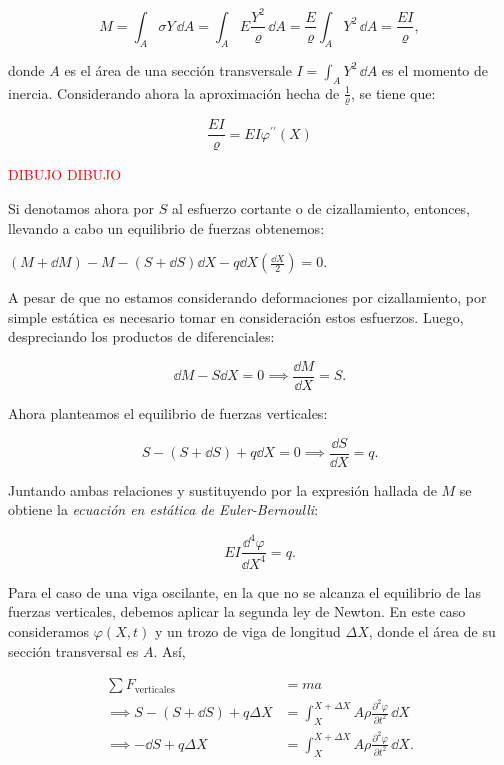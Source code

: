 \[M = \int_A \sigma Y \, \dd A = \int_A E \frac{Y^2}{\varrho} \, \dd A = \frac{E}{\varrho} \int_A Y^2 \, \dd A = \frac{E I}{\varrho},\]

donde $A$ es el área de una sección transversal\footnotemark e $I = \int_A Y^2 \, \dd A$ es el momento de inercia. Considerando ahora la aproximación hecha de $\frac{1}{\varrho}$, se tiene que:

\[\frac{E I}{\varrho} = EI \varphi^{\prime \prime}(X)\]

\textcolor{red}{DIBUJO}
\textcolor{red}{DIBUJO}

Si denotamos ahora por $S$ al esfuerzo cortante o de cizallamiento, entonces, llevando a cabo un equilibrio de fuerzas obtenemos:

$(M + \dd M) - M - (S + \dd S)\dd X - q \dd X \left(\frac{\dd X}{2}\right) = 0.$

A pesar de que no estamos considerando deformaciones por cizallamiento, por simple estática es necesario tomar en consideración estos esfuerzos. Luego, despreciando los productos de diferenciales:

\[\dd M - S\dd X = 0 \implies \frac{\dd M}{\dd X} = S.\]

Ahora planteamos el equilibrio de fuerzas verticales:

\[S - (S + \dd S) + q \dd X = 0 \implies \frac{\dd S}{\dd X} = q.\]

Juntando ambas relaciones y sustituyendo por la expresión hallada de $M$ se obtiene la \textit{ecuación en estática de Euler-Bernoulli}:

\[EI \frac{\dd^4\varphi}{\dd X^4} = q.\]

Para el caso de una viga oscilante, en la que no se alcanza el equilibrio de las fuerzas verticales, debemos aplicar la segunda ley de Newton. En este caso consideramos $\varphi(X,t)$ y un trozo de viga de longitud $\Delta X$, donde el área de su sección transversal es $A$. Así,

\begin{align*}
    \sum F_{\text{verticales}} &= m a\\
    \implies S - (S + \dd S) + q\Delta X &= \int_{X}^{X + \Delta X} A \rho \frac{\partial^2 \varphi}{\partial t^2} \, \dd X\\
    \implies -\dd S + q\Delta X &= \int_{X}^{X + \Delta X} A \rho \frac{\partial^2 \varphi}{\partial t^2} \, \dd X.
\end{align*}

